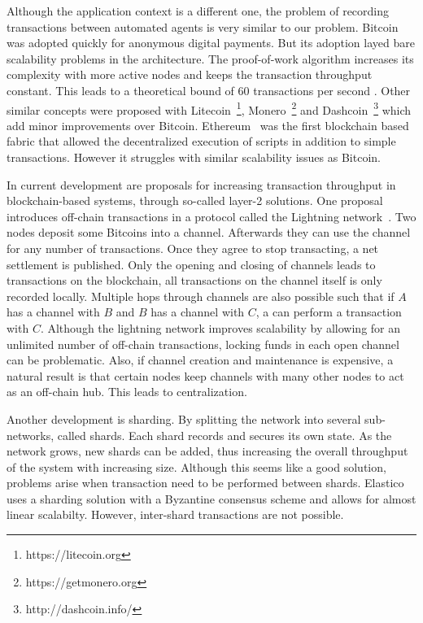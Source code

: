 Although the application context is a different one, the problem of recording transactions between
automated agents is very similar to our problem. Bitcoin was adopted quickly for anonymous digital 
payments. But its adoption layed bare scalability problems in the architecture. The proof-of-work
algorithm increases its complexity with more active nodes and keeps the transaction throughput 
constant. This leads to a theoretical bound of 60 transactions per second \cite{gervais2016security}. 
Other similar concepts were proposed with Litecoin~\footnote{https://litecoin.org}, Monero~\footnote{https://getmonero.org}
and Dashcoin~\footnote{http://dashcoin.info/} which add minor improvements over Bitcoin.
Ethereum~\cite{wood2014ethereum} was the first blockchain based fabric that allowed the decentralized
execution of scripts in addition to simple transactions. However it struggles with similar scalability
issues as Bitcoin.

In current development are proposals for increasing transaction throughput in blockchain-based 
systems, through so-called layer-2 solutions. One proposal introduces off-chain transactions in a protocol called the Lightning network~\cite{poon2016bitcoin}.
Two nodes deposit some Bitcoins into a channel. Afterwards they can use the channel for any number
of transactions. Once they agree to stop transacting, a net settlement is published. Only the 
opening and closing of channels leads to transactions on the blockchain, all transactions on the 
channel itself is only recorded locally. Multiple hops through channels are also possible such that 
if $A$ has a channel with $B$ and $B$ has a channel with $C$, a can perform a transaction with $C$. 
Although the lightning network improves scalability by allowing for an unlimited number of off-chain 
transactions, locking funds in each open channel can be problematic. Also, if channel creation and 
maintenance is expensive, a natural result is that certain nodes keep channels with many other 
nodes to act as an off-chain hub. This leads to centralization.

Another development is sharding. By splitting the network into several sub-networks, called shards.
Each shard records and secures its own state. As the network grows, new shards can be added, thus 
increasing the overall throughput of the system with increasing size. Although this seems like a 
good solution, problems arise when transaction need to be performed between shards. Elastico~\cite{luu2016secure}
uses a sharding solution with a Byzantine consensus scheme and allows for almost linear scalabilty.
However, inter-shard transactions are not possible.

